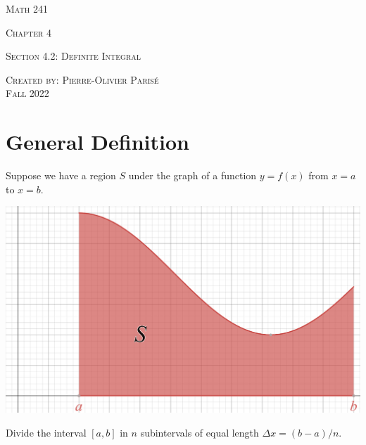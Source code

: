 \documentclass[12pt,a4paper]{article}
\begin{document}
\thispagestyle{empty}

\begin{center}
\vspace*{2.5cm}

{\Huge \textsc{Math 241}}

\vspace*{2cm}

{\LARGE \textsc{Chapter 4}} 

\vspace*{0.75cm}

\noindent\textsc{Section 4.2: Definite Integral}

\vspace*{0.75cm}

\tableofcontents

\vfill

\noindent \textsc{Created by: Pierre-Olivier Paris{\'e}} \\
\textsc{Fall 2022}
\end{center}

\section{General Definition}

Suppose we have a region $S$ under the graph of a function $y= f(x)$ from $x = a$ to $x = b$.

	\begin{center}
	\includegraphics[scale=0.39]{regionS.png}
	\end{center}
	
\textbullet Divide the interval $[a, b]$ in $n$ subintervals of equal length $\Delta x = (b - a)/n$.
\end{document}

